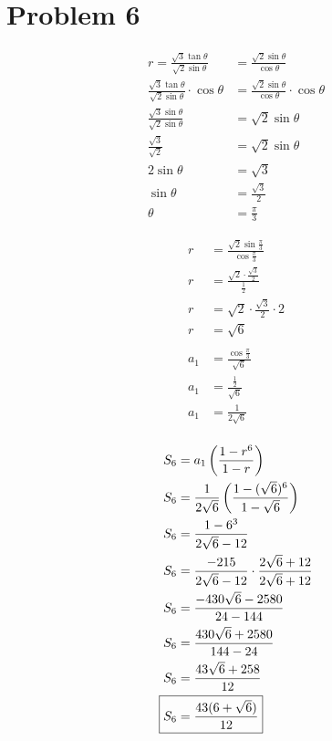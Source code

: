 \documentclass{article}
\begin{document}
\section*{Problem 6}
\centering
\begin{minipage}[t]{0.3\linewidth}
\begin{align*}
	r=\frac{\sqrt{3}\tan\theta}{\sqrt{2}\sin\theta}&=
		\frac{\sqrt{2}\sin\theta}{\cos\theta} \\
	\frac{\sqrt{3}\tan\theta}{\sqrt{2}\sin\theta}\cdot\cos\theta&=
		\frac{\sqrt{2}\sin\theta}{\cos\theta}\cdot\cos\theta \\
	\frac{\sqrt{3}\sin\theta}{\sqrt{2}\sin\theta}&=
		\sqrt{2}\sin\theta \\
	\frac{\sqrt{3}}{\sqrt{2}}&=\sqrt{2}\sin\theta \\
	2\sin\theta&=\sqrt{3} \\
	\sin\theta&=\frac{\sqrt{3}}{2} \\
	\theta&=\frac{\pi}{3}
\end{align*}
\end{minipage}
\begin{minipage}[t]{0.25\linewidth}
\begin{align*}
	r&=\frac{\sqrt{2}\sin\frac{\pi}{3}}{\cos\frac{\pi}{3}} \\
	r&=\frac{\sqrt{2}\cdot\frac{\sqrt{3}}{2}}{\frac{1}{2}} \\
	r&=\sqrt{2}\cdot\frac{\sqrt{3}}{2}\cdot2 \\
	r&=\sqrt{6} \\
	\\
	a_1&=\frac{\cos\frac{\pi}{3}}{\sqrt{6}} \\
	a_1&=\frac{\frac{1}{2}}{\sqrt{6}} \\
	a_1&=\frac{1}{2\sqrt{6}} \\
\end{align*}
\end{minipage}
\begin{minipage}[t]{0.25\linewidth}
\begin{align*}
	S_6&=a_1\left(\frac{1-r^6}{1-r}\right) \\
	S_6&=\frac{1}{2\sqrt{6}}\left(
			\frac{1-(\sqrt{6})^6}{1-\sqrt{6}}\right) \\
	S_6&=\frac{1-6^3}{2\sqrt{6}-12} \\
	S_6&=\frac{-215}{2\sqrt{6}-12}\cdot
		\frac{2\sqrt{6}+12}{2\sqrt{6}+12} \\
	S_6&=\frac{-430\sqrt{6}-2580}{24-144} \\
	S_6&=\frac{430\sqrt{6}+2580}{144-24} \\
	S_6&=\frac{43\sqrt{6}+258}{12} \\
	\Aboxed{S_6&=\frac{43(6+\sqrt{6})}{12}} \\
\end{align*}
\end{minipage}
\flushleft
\end{document}
